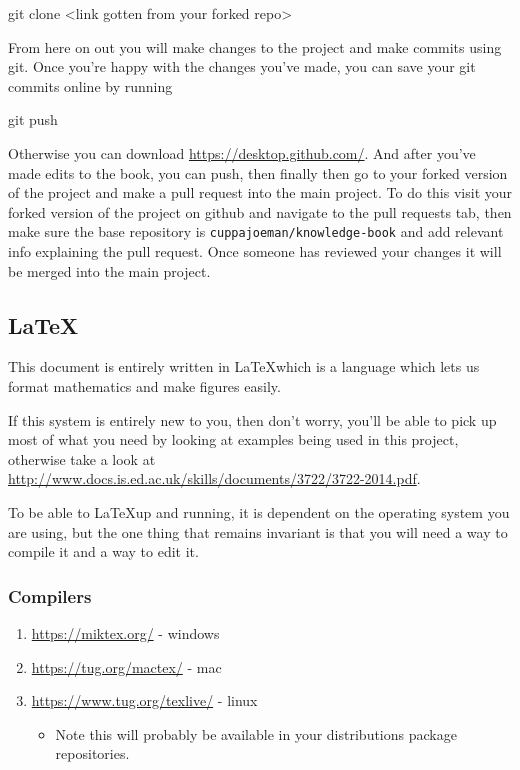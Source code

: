\begin{term}
git clone <link gotten from your forked repo>
\end{term}

From here on out you will make changes to the project and make commits using git. Once you're happy with the changes you've made, you can save your git commits online by running

\begin{term}
git push
\end{term}

Otherwise you can download \url{https://desktop.github.com/}. And after you've made edits to the book, you can push, then finally then go to your forked version of the project and make a pull request into the main project. To do this visit your forked version of the project on github and navigate to the pull requests tab, then make sure the base repository is \texttt{cuppajoeman/knowledge-book} and add relevant info explaining the pull request. Once someone has reviewed your changes it will be merged into the main project.

\subsection*{\LaTeX}

This document is entirely written in \LaTeX which is a language which lets us format mathematics and make figures easily.

If this system is entirely new to you, then don't worry, you'll be able to pick up most of what you need by looking at examples being used in this project, otherwise take a look at \url{http://www.docs.is.ed.ac.uk/skills/documents/3722/3722-2014.pdf}.

To be able to \LaTeX up and running, it is dependent on the operating system you are using, but the one thing that remains invariant is that you will need a way to compile it and a way to edit it.


\subsubsection*{Compilers}
\begin{enumerate}
    \item \url{https://miktex.org/} - windows
    \item \url{https://tug.org/mactex/} - mac
    \item \url{https://www.tug.org/texlive/} - linux 
    \begin{itemize}
        \item Note this will probably be available in your distributions package repositories.
    \end{itemize}
\end{enumerate}


